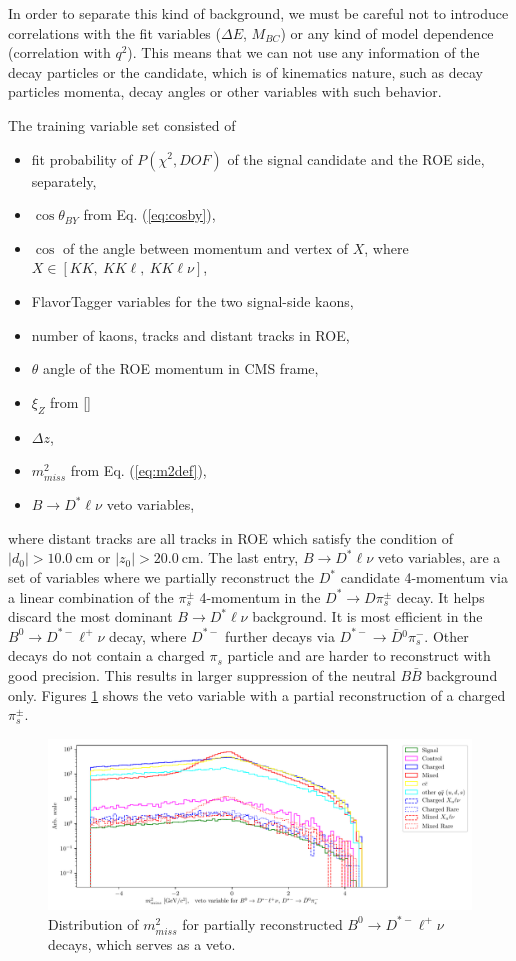 \documentclass[oneside,a4paper,openany,12pt]{scrbook}
\newcommand {\e}[1]{\mathrm{~#1}}
\begin{document}
In order to separate this kind of background, we must be careful not to introduce correlations with the fit variables ($\Delta E$, $M_{BC}$) or any kind of model dependence (correlation with $q^2$). This means that we can not use any information of the decay particles or the candidate, which is of kinematics nature, such as decay particles momenta, decay angles or other variables with such behavior.

The training variable set consisted of
\begin{itemize}
\item fit probability of $P(\chi^2,DOF)$ of the signal candidate and the ROE side, separately,
\item $\cos\theta_{BY}$ from Eq. (\ref{eq:cosby}),
\item $\cos$ of the angle between momentum and vertex of $X$, where $X \in [KK,~KK\ell,~KK\ell\nu]$,
\item FlavorTagger variables for the two signal-side kaons,
\item number of kaons, tracks and distant tracks in ROE,
\item $\theta$ angle of the ROE momentum in CMS frame,
\item $\xi_Z$ from []
\item $\Delta z$,
\item $m_{miss}^2$ from Eq. (\ref{eq:m2def}),
\item $B \to D^* \ell \nu$ veto variables,
\end{itemize}
where distant tracks are all tracks in ROE which satisfy the condition of $\vert d_0 \vert  > 10.0\e{cm}$ or $\vert z_0 \vert > 20.0\e{cm}$. The last entry, $B \to D^* \ell \nu$ veto variables, are a set of variables where we partially reconstruct the $D^*$ candidate 4-momentum via a linear combination of the $\pi^\pm_s$ 4-momentum in the $D^* \to D \pi_s^\pm$ decay. It helps discard the most dominant $B \to D^* \ell \nu$ background. It is most efficient in the $B^0 \to D^{*-} \ell^+ \nu$ decay, where $D^{*-}$ further decays via $D^{*-} \to \bar D {}^0 \pi^-_s$. Other decays do not contain a charged $\pi_s$ particle and are harder to reconstruct with good precision. This results in larger suppression of the neutral $B \bar B$ background only. Figures \ref{fig:vetoplot} shows the veto variable with a partial reconstruction of a charged $\pi_s^\pm$.

\begin{figure}[H]
\centering
\captionsetup{width=0.8\linewidth}
\includegraphics[width=\linewidth]{fig/bb_partial_veto}
\caption{Distribution of $m_{miss}^2$ for partially reconstructed $B^0 \to D^{*-} \ell^+ \nu$ decays, which serves as a veto.}
\label{fig:vetoplot}
\end{figure}
\end{document}
